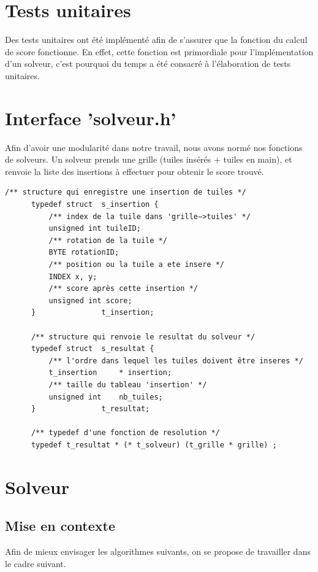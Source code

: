 \documentclass[10pt]{article}
\begin{document}
  \section{Tests unitaires}
    Des tests unitaires ont été implémenté afin de s'assurer que la fonction du calcul de score fonctionne.
    En effet, cette fonction est primordiale pour l'implémentation d'un solveur, c'est pourquoi
    du temps a été consacré à l'élaboration de tests unitaires.
  \section{Interface 'solveur.h'}
    Afin d'avoir une modularité dans notre travail, nous avons normé nos fonctions de solveurs.
    Un solveur prends une grille (tuiles insérés + tuiles en main), et renvoie la liste des insertions
    à effectuer pour obtenir le score trouvé.
    \lstset{language=C}          %
    \begin{lstlisting}[frame=single]  % Start your code-block
      /** structure qui enregistre une insertion de tuiles */
      typedef struct  s_insertion {
	      /** index de la tuile dans 'grille−>tuiles' */
	      unsigned int tuileID;
	      /** rotation de la tuile */
	      BYTE rotationID;
	      /** position ou la tuile a ete insere */
	      INDEX x, y;
	      /** score après cette insertion */
	      unsigned int score;
      }               t_insertion;

      /** structure qui renvoie le resultat du solveur */
      typedef struct  s_resultat {
	      /** l'ordre dans lequel les tuiles doivent être inseres */
	      t_insertion     * insertion;
	      /** taille du tableau 'insertion' */
	      unsigned int    nb_tuiles;
      }               t_resultat;

      /** typedef d'une fonction de resolution */
      typedef t_resultat * (* t_solveur) (t_grille * grille) ;
    \end{lstlisting}
    \newpage
    \section{Solveur}\label{solveur}
    \subsection{Mise en contexte}
      Afin de mieux envisager les algorithmes suivants, on se propose de travailler dans le cadre suivant.
\end{document}
